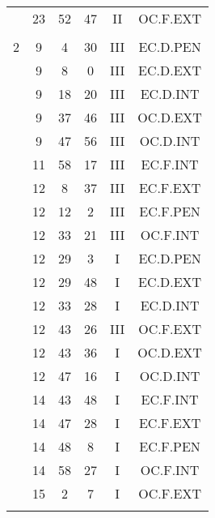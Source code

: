 \documentclass[12pt, a4paper]{article}
\begin{document}
\begin{multicols}{3}
{\begin{tabular}{c c c c c c}
	 	 	 	 & 23 & 52 & 47 & II & OC.F.EXT\\%
	 	 	 	 & & & & & \\%
	 	 	 	2 & 9 & 4 & 30 & III & EC.D.PEN\\%
	 	 	 	 & 9 & 8 & 0 & III & EC.D.EXT\\%
	 	 	 	 & 9 & 18 & 20 & III & EC.D.INT\\%
	 	 	 	 & 9 & 37 & 46 & III & OC.D.EXT\\%
	 	 	 	 & 9 & 47 & 56 & III & OC.D.INT\\%
	 	 	 	 & 11 & 58 & 17 & III & EC.F.INT\\%
	 	 	 	 & 12 & 8 & 37 & III & EC.F.EXT\\%
	 	 	 	 & 12 & 12 & 2 & III & EC.F.PEN\\%
	 	 	 	 & 12 & 33 & 21 & III & OC.F.INT\\%
	 	 	 	 & 12 & 29 & 3 & I & EC.D.PEN\\%
	 	 	 	 & 12 & 29 & 48 & I & EC.D.EXT\\%
	 	 	 	 & 12 & 33 & 28 & I & EC.D.INT\\%
	 	 	 	 & 12 & 43 & 26 & III & OC.F.EXT\\%
	 	 	 	 & 12 & 43 & 36 & I & OC.D.EXT\\%
	 	 	 	 & 12 & 47 & 16 & I & OC.D.INT\\%
	 	 	 	 & 14 & 43 & 48 & I & EC.F.INT\\%
	 	 	 	 & 14 & 47 & 28 & I & EC.F.EXT\\%
	 	 	 	 & 14 & 48 & 8 & I & EC.F.PEN\\%
	 	 	 	 & 14 & 58 & 27 & I & OC.F.INT\\%
	 	 	 	 & 15 & 2 & 7 & I & OC.F.EXT\\%
	 	 	 	 & & & & & \\%

\end{tabular}}
\end{multicols}
\end{document}
